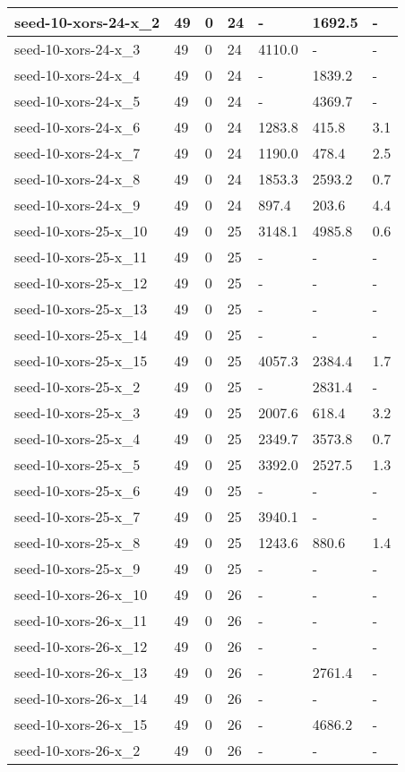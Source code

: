 \begin{scriptsize}
\begin{longtable}{|p{5cm}|l|l|l|l|l|l|}
seed-10-xors-24-x\_2&49&0&24&-&1692.5&- \\ \hline 
seed-10-xors-24-x\_3&49&0&24&4110.0&-&- \\ \hline 
seed-10-xors-24-x\_4&49&0&24&-&1839.2&- \\ \hline 
seed-10-xors-24-x\_5&49&0&24&-&4369.7&- \\ \hline 
seed-10-xors-24-x\_6&49&0&24&1283.8&415.8&3.1 \\ \hline 
seed-10-xors-24-x\_7&49&0&24&1190.0&478.4&2.5 \\ \hline 
seed-10-xors-24-x\_8&49&0&24&1853.3&2593.2&0.7 \\ \hline 
seed-10-xors-24-x\_9&49&0&24&897.4&203.6&4.4 \\ \hline 
seed-10-xors-25-x\_10&49&0&25&3148.1&4985.8&0.6 \\ \hline 
seed-10-xors-25-x\_11&49&0&25&-&-&- \\ \hline 
seed-10-xors-25-x\_12&49&0&25&-&-&- \\ \hline 
seed-10-xors-25-x\_13&49&0&25&-&-&- \\ \hline 
seed-10-xors-25-x\_14&49&0&25&-&-&- \\ \hline 
seed-10-xors-25-x\_15&49&0&25&4057.3&2384.4&1.7 \\ \hline 
seed-10-xors-25-x\_2&49&0&25&-&2831.4&- \\ \hline 
seed-10-xors-25-x\_3&49&0&25&2007.6&618.4&3.2 \\ \hline 
seed-10-xors-25-x\_4&49&0&25&2349.7&3573.8&0.7 \\ \hline 
seed-10-xors-25-x\_5&49&0&25&3392.0&2527.5&1.3 \\ \hline 
seed-10-xors-25-x\_6&49&0&25&-&-&- \\ \hline 
seed-10-xors-25-x\_7&49&0&25&3940.1&-&- \\ \hline 
seed-10-xors-25-x\_8&49&0&25&1243.6&880.6&1.4 \\ \hline 
seed-10-xors-25-x\_9&49&0&25&-&-&- \\ \hline 
seed-10-xors-26-x\_10&49&0&26&-&-&- \\ \hline 
seed-10-xors-26-x\_11&49&0&26&-&-&- \\ \hline 
seed-10-xors-26-x\_12&49&0&26&-&-&- \\ \hline 
seed-10-xors-26-x\_13&49&0&26&-&2761.4&- \\ \hline 
seed-10-xors-26-x\_14&49&0&26&-&-&- \\ \hline 
seed-10-xors-26-x\_15&49&0&26&-&4686.2&- \\ \hline 
seed-10-xors-26-x\_2&49&0&26&-&-&- \\ \hline 

\end{longtable}
\end{scriptsize}
